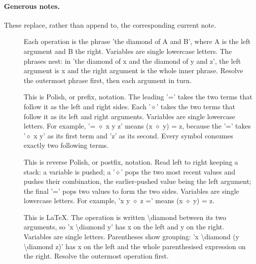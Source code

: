 \documentclass{article}
\newcommand{\code}[1]{\texttt{\detokenize{#1}}}
\begin{document}
\paragraph{Generous notes.}
These replace, rather than append to, the corresponding current note.
\begin{description}
\item[\code{text2}] Each operation is the phrase 'the diamond of A and B', where A is the left argument and B the right. Variables are single lowercase letters. The phrases nest: in 'the diamond of x and the diamond of y and z', the left argument is x and the right argument is the whole inner phrase. Resolve the outermost phrase first, then each argument in turn.
\item[\code{polish}] This is Polish, or prefix, notation. The leading '=' takes the two terms that follow it as the left and right sides. Each '$\diamond$' takes the two terms that follow it as its left and right arguments. Variables are single lowercase letters. For example, '= $\diamond$ x y z' means (x $\diamond$ y) = z, because the '=' takes '$\diamond$ x y' as its first term and 'z' as its second. Every symbol consumes exactly two following terms.
\item[\code{rpn}] This is reverse Polish, or postfix, notation. Read left to right keeping a stack: a variable is pushed; a '$\diamond$' pops the two most recent values and pushes their combination, the earlier-pushed value being the left argument; the final '=' pops two values to form the two sides. Variables are single lowercase letters. For example, 'x y $\diamond$ z =' means (x $\diamond$ y) = z.
\item[\code{latex}] This is LaTeX. The operation is written \textbackslash{}diamond between its two arguments, so 'x \textbackslash{}diamond y' has x on the left and y on the right. Variables are single letters. Parentheses show grouping: 'x \textbackslash{}diamond (y \textbackslash{}diamond z)' has x on the left and the whole parenthesised expression on the right. Resolve the outermost operation first.
\end{description}
\end{document}
